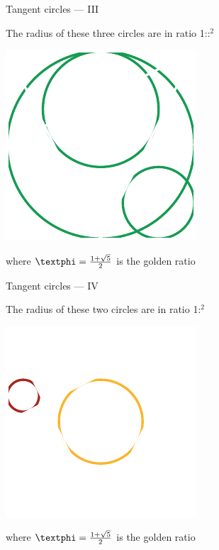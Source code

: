 \documentclass[14pt]{beamer}
\begin{document}

    \begin{frame}{Tangent circles --- III}
        \begin{center}
            The radius of these three circles are in ratio 1:\textphi:\textphi$^2$
        \end{center}\medskip
        \hspace{6.18em} \includegraphics[scale=1.0]{figures/figure019f.pdf} \\
        \begin{center}
             where $\text{\textphi} =\tfrac{1+\sqrt{5}}{2}$ is the golden ratio
        \end{center}
    \end{frame}


    \begin{frame}{Tangent circles --- IV}
        \begin{center}
            The radius of these two circles are in ratio 1:\textphi$^2$
        \end{center}\medskip
        \hspace{6.18em} \includegraphics[scale=1.0]{figures/figure019h.pdf} \\
        \begin{center}
             where $\text{\textphi} =\tfrac{1+\sqrt{5}}{2}$ is the golden ratio
        \end{center}
    \end{frame}
\end{document}
